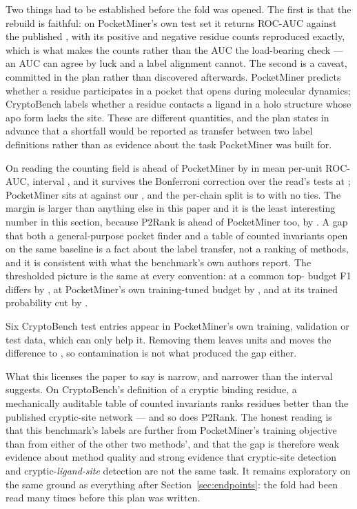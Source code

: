 \documentclass[11pt]{article}
\begin{document}
Two things had to be established before the fold was opened. The first is that
the rebuild is faithful: on PocketMiner's own test set it returns ROC-AUC
\PmSelfAuc{} against the published \PmSelfPublished{}, with its positive and
negative residue counts reproduced exactly, which is what makes the counts rather
than the AUC the load-bearing check --- an AUC can agree by luck and a label
alignment cannot. The second is a caveat, committed in the plan rather than
discovered afterwards. PocketMiner predicts whether a residue participates in a
pocket that opens during molecular dynamics; CryptoBench labels whether a residue
contacts a ligand in a holo structure whose apo form lacks the site. These are
different quantities, and the plan states in advance that a shortfall would be
reported as transfer between two label definitions rather than as evidence about
the task PocketMiner was built for.

On reading \PmReadIndex{} the counting field is ahead of PocketMiner by
\PmAucOurs{} in mean per-unit ROC-AUC, interval \PmAucCIOurs{}, and it survives
the Bonferroni correction over the read's \PmNTests{} tests at
\PmAucBonfOurs{}; PocketMiner sits at \PmLevel{} against our \TabAuc{}, and
the per-chain split is \PmWinOurs{} to \PmLossOurs{} with no ties. The margin is
larger than anything else in this paper and it is the least interesting number in
this section, because P2Rank is ahead of PocketMiner too, by \PmAucPtwoR{}
\PmAucCIPtwoR{}. A gap that both a general-purpose pocket finder and a table of
counted invariants open on the same baseline is a fact about the label transfer,
not a ranking of methods, and it is consistent with what the benchmark's own
authors report. The thresholded picture is the same at every convention: at a
common top-\MatchOurQ{} budget F1 differs by \PmBudgetFDelta{}
\PmBudgetFCI{}, at PocketMiner's own training-tuned budget by
\PmTheirBudgetFDelta{} \PmTheirBudgetFCI{}, and at its trained probability cut by
\PmTheirCutFDelta{} \PmTheirCutFCI{}.

Six CryptoBench test entries appear in PocketMiner's own training, validation or
test data, which can only help it. Removing them leaves \PmCleanN{} units and
moves the difference to \PmCleanAuc{} \PmCleanAucCI{}, so contamination is not
what produced the gap either.

What this licenses the paper to say is narrow, and narrower than the interval
suggests. On CryptoBench's definition of a cryptic binding residue, a
mechanically auditable table of counted invariants ranks residues better than the
published cryptic-site network --- and so does P2Rank. The honest reading is that
this benchmark's labels are further from PocketMiner's training objective than
from either of the other two methods', and that the gap is therefore weak
evidence about method quality and strong evidence that cryptic-site detection and
cryptic-\emph{ligand-site} detection are not the same task. It remains
exploratory on the same ground as everything after
Section~\ref{sec:endpoints}: the fold had been read many times before this plan
was written.
\end{document}
